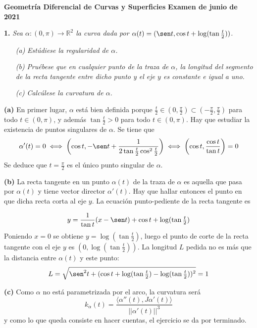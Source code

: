 \documentclass[12pt]{report}
\newcommand{\R}{\mathbb R}
\begin{document}
\small

\textbf{Geometría Diferencial de Curvas y Superficies} \hfill \textbf{Examen de junio de 2021}
\linebreak

\textbf{1.} \textit{Sea $\alpha \colon (0,\pi) \to \R^2$ la curva dada por $\alpha(t) = (\sen t, \cos t +\log(\tan\frac{t}{2}))$.}
\begin{itemize}
    \item[\textit{(a)}] \textit{Estúdiese la regularidad de $\alpha$.}
    \item[\textit{(b)}] \textit{Pruébese que en cualquier punto de la traza de $\alpha$, la longitud del segmento de la recta tangente entre dicho punto y el eje  $y$ es constante e igual a uno.}
    \item[\textit{(c)}] \textit{Calcúlese la curvatura de $\alpha$.}
\end{itemize}

\vspace{2mm}
\textbf{(a) } En primer lugar, $\alpha$ está bien definida porque $\frac{t}{2} \in (0,\frac{\pi}{2}) \subset (-\frac{\pi}{2},\frac{\pi}{2})$ para todo $t \in (0,\pi)$, y además $\tan\frac{t}{2} > 0$ para todo $t \in (0,\pi)$. Hay que estudiar la existencia de puntos singulares de $\alpha$. Se tiene que
\[\alpha'(t) = 0 \iff \biggl(\cos t, -\sen t+\frac{1}{2\tan\frac{t}{2}\cos^2\frac{t}{2}}\biggr) \iff \biggl(\cos t, \frac{\cos t}{\tan t}\biggr) = 0\]
Se deduce que $t = \frac{\pi}{2}$ es el único punto singular de $\alpha$.

\vspace{2mm}
\textbf{(b) } La recta tangente en un punto $\alpha(t)$ de la traza de $\alpha$ es aquella que pasa por $\alpha(t)$ y tiene vector director $\alpha'(t)$. Hay que hallar entonces el punto en que dicha recta corta al eje $y$. La ecuación punto-pediente de la recta tangente es

\[
y = \frac{1}{\tan t}(x - \sen t)+\cos t + \log (\tan \textstyle \frac{t}{2})
\]
Poniendo $x = 0$ se obtiene $y = \log(\tan\frac{t}{2})$, luego el punto de corte de la recta tangente con el eje $y$ es $(0,\log(\tan\frac{t}{2}))$. La longitud $L$ pedida no es más que la distancia entre $\alpha(t)$ y este punto:
\[L = \sqrt{\sen^2t+(\cos t +\log (\textstyle \tan \frac{t}{2})-\log(\tan\frac{t}{2}))^2} = 1\]

\vspace{2mm}
\textbf{(c)} Como $\alpha$ no está parametrizada por el arco, la curvatura será
\[k_\alpha(t)=\frac{\langle \alpha''(t),J\alpha'(t)\rangle}{||\alpha'(t)||^3}\]
y como lo que queda consiste en hacer cuentas, el ejercicio se da por terminado.
\end{document}
